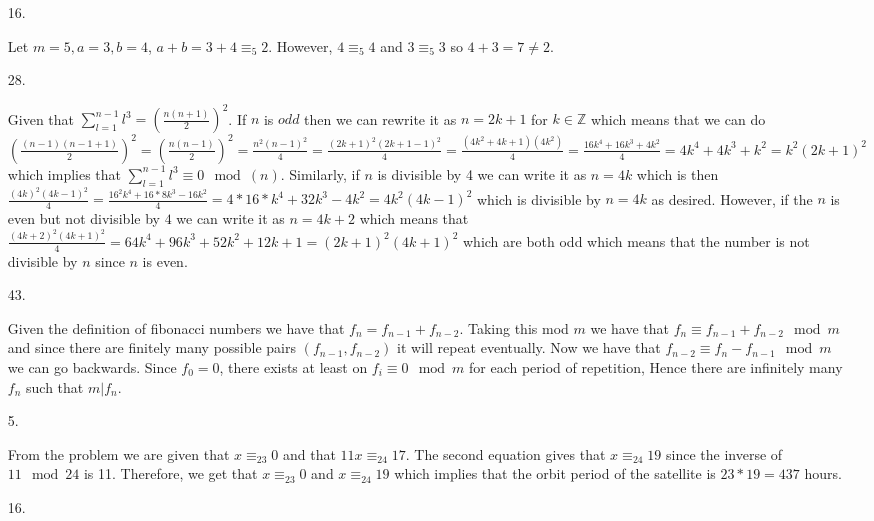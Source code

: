 \documentclass{article}
\theoremstyle{definition}
\newcommand{\Z}{\mathbb{Z}}
\begin{document}
\begin{enumerate}
    \item [16. ]
    
    Let $m = 5, a = 3, b = 4$, $a + b = 3 + 4 \equiv_5 2.$ However, $4\equiv_5 4$ and $3\equiv_5 3$ so $4 + 3 = 7 \neq 2.$
    
    \item [28. ]
    
    Given that $\sum_{l = 1}^{n-1}l^3 = (\frac{n(n+1)}{2})^2$. If $n$ is $odd$ then we can rewrite it as $n = 2k+1$ for $k \in \Z$ which means that we can do $(\frac{(n-1)(n-1+1)}{2})^2 = (\frac{n(n-1)}{2})^2 = \frac{n^2(n-1)^2}{4} = \frac{(2k+1)^2(2k+1-1)^2}{4} = \frac{(4k^2+4k+1)(4k^2)}{4} = \frac{16k^4 + 16k^3 + 4k^2}{4} = 4k^4 + 4k^3 + k^2 = k^2(2k+1)^2$ which implies that $\sum_{l=1}^{n-1}l^3 \equiv 0\mod(n)$. Similarly, if $n$ is divisible by 4 we can write it as $n = 4k$ which is then $\frac{(4k)^2(4k-1)^2}{4} = \frac{16^2k^4+16*8k^3-16k^2}{4}= 4*16*k^4+32k^3 -4k^2 = 4k^2(4k-1)^2$ which is divisible by $n=4k$ as desired. However, if the $n$ is even but not divisible by $4$ we can write it as $n = 4k+2$ which means that $\frac{(4k+2)^2(4k+1)^2}{4} = 64k^4+96k^3+52k^2+12k+1 = (2k+1)^2(4k+1)^2$ which are both odd which means that the number is not divisible by $n$ since $n$ is even.
    
    \item [43. ]
    
    Given the definition of fibonacci numbers we have that $f_n = f_{n-1} + f_{n-2}$. Taking this mod $m$ we have that $f_n \equiv f_{n-1} + f_{n-2} \mod m$ and since there are finitely many possible pairs $(f_{n-1}, f_{n-2})$ it will repeat eventually. Now we have that $f_{n-2} \equiv f_n - f_{n-1}\mod m$ we can go backwards. Since $f_0 = 0$, there exists at least on $f_i\equiv 0\mod m$ for each period of repetition, Hence there are infinitely many $f_n$ such that $m|f_n.$
    
    \item [5. ]
    
    From the problem we are given that $x \equiv_{23} 0$ and that $11x \equiv_{24} 17$. The second equation gives that $x\equiv_{24} 19$ since the inverse of $11\mod 24$ is 11. Therefore, we get that $x\equiv_{23} 0$ and $x\equiv_{24} 19$ which implies that the orbit period of the satellite is $23*19 = 437$ hours. 
    
    \item [16. ]
    

\end{enumerate}
\end{document}
